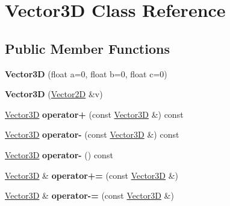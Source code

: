 \hypertarget{class_vector3_d}{\section{Vector3\-D Class Reference}
\label{class_vector3_d}
}
\subsection*{Public Member Functions}
\begin{DoxyCompactItemize}
\item 
\hypertarget{class_vector3_d_a30aeeb737a0982efdba3b0942aaf1c9e}{{\bfseries Vector3\-D} (float a=0, float b=0, float c=0)}\label{class_vector3_d_a30aeeb737a0982efdba3b0942aaf1c9e}

\item 
\hypertarget{class_vector3_d_ad9cb2ecfe33b2ad7fd23f9d24d606ab5}{{\bfseries Vector3\-D} (\hyperlink{class_vector2_d}{Vector2\-D} \&v)}\label{class_vector3_d_ad9cb2ecfe33b2ad7fd23f9d24d606ab5}

\item 
\hypertarget{class_vector3_d_a5c0a69fd6181b90fe3dffe6507386fe9}{\hyperlink{class_vector3_d}{Vector3\-D} {\bfseries operator+} (const \hyperlink{class_vector3_d}{Vector3\-D} \&) const }\label{class_vector3_d_a5c0a69fd6181b90fe3dffe6507386fe9}

\item 
\hypertarget{class_vector3_d_add4e475057a8fa5e1cd982fedad79827}{\hyperlink{class_vector3_d}{Vector3\-D} {\bfseries operator-\/} (const \hyperlink{class_vector3_d}{Vector3\-D} \&) const }\label{class_vector3_d_add4e475057a8fa5e1cd982fedad79827}

\item 
\hypertarget{class_vector3_d_a03f189f8d45eda497772364d19d30c7d}{\hyperlink{class_vector3_d}{Vector3\-D} {\bfseries operator-\/} () const }\label{class_vector3_d_a03f189f8d45eda497772364d19d30c7d}

\item 
\hypertarget{class_vector3_d_a878a97733a49fe99b7836475d5b1cf7d}{\hyperlink{class_vector3_d}{Vector3\-D} \& {\bfseries operator+=} (const \hyperlink{class_vector3_d}{Vector3\-D} \&)}\label{class_vector3_d_a878a97733a49fe99b7836475d5b1cf7d}

\item 
\hypertarget{class_vector3_d_a8facd6e805d6618eb2e2d5c04ec7b903}{\hyperlink{class_vector3_d}{Vector3\-D} \& {\bfseries operator-\/=} (const \hyperlink{class_vector3_d}{Vector3\-D} \&)}\label{class_vector3_d_a8facd6e805d6618eb2e2d5c04ec7b903}


\end{DoxyCompactItemize}
